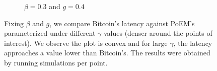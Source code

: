 \begin{figure}[h]
\begin{subfigure}{0.8\textwidth}
    \caption{$\beta = 0.3$ and $g = 0.4$}
    \label{fig:gamma_latency_0.3}
    \end{subfigure}

  \caption{Fixing $\beta$ and $g$, we compare Bitcoin's latency against PoEM's parameterized under different $\gamma$ values
           (denser around the points of interest).
          We observe the plot is convex and for large $\gamma$, the latency
          approaches a value lower than Bitcoin's. The results were obtained by running \montecarlo{} simulations per point.}
    \label{fig:gamma_latency}
\end{figure}